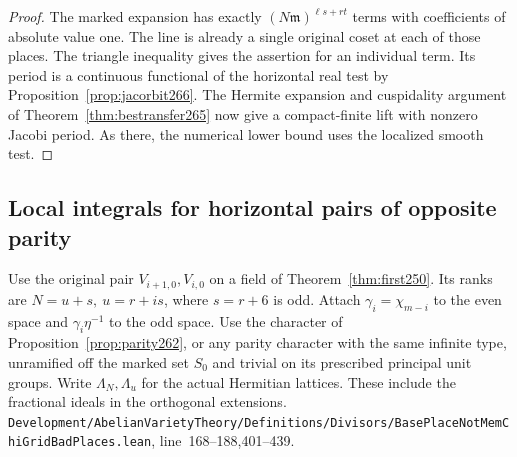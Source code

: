 \documentclass[a4paper,11pt]{article}
\theoremstyle{definition}
\theoremstyle{remark}
\newcommand{\srcloc}[2]{{\small\nolinkurl{#1.lean}}, line~#2}
\numberwithin{equation}{section}
\begin{document}
\begin{proof}
The marked expansion has exactly
\((N\mathfrak m)^{\ell s+rt}\) terms with coefficients of
absolute value one. The line is already a single original
coset at each of those places. The triangle inequality gives
the assertion for an individual term. Its period is a
continuous functional of the horizontal real test by
Proposition~\ref{prop:jacorbit266}. The Hermite expansion
and cuspidality argument of Theorem~\ref{thm:bestransfer265}
now give a compact-finite lift with nonzero Jacobi period.
As there, the numerical lower bound uses the localized smooth
test.
\end{proof}

\subsection{Local integrals for horizontal pairs of opposite parity}\label{nav:IX-40}
Use the original pair \(V_{i+1,0},V_{i,0}\) on a field of
Theorem~\ref{thm:first250}. Its ranks are \(N=u+s,\ u=r+is\),
where \(s=r+6\) is odd. Attach
\(\gamma_i=\chi_{m-i}\) to the even space and
\(\gamma_i\eta^{-1}\) to the odd space. Use the character of
Proposition~\ref{prop:parity262}, or any parity character with
the same infinite type, unramified off the marked set \(S_0\)
and trivial on its prescribed principal unit groups. Write
\(\Lambda_N,\Lambda_u\) for the actual Hermitian lattices.
These include the fractional ideals in the orthogonal extensions.
\srcloc{Development/AbelianVarietyTheory/Definitions/Divisors/BasePlaceNotMemChiGridBadPlaces}{168--188,401--439}.
\end{document}
